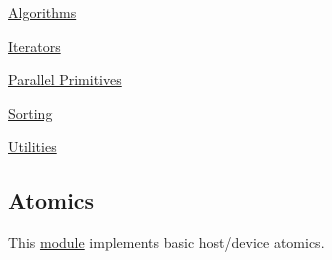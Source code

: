 \begin{DoxyItemize}
\item \hyperlink{algorithms_page}{Algorithms}
\item \hyperlink{iterators_page}{Iterators}
\item \hyperlink{primitives_page}{Parallel Primitives}
\item \hyperlink{sorting_page}{Sorting}
\item \hyperlink{utilities_page}{Utilities} 
\end{DoxyItemize}\hypertarget{atomics_page}{}\subsection{Atomics}\label{atomics_page}
\begin{DoxyParagraph}{}
This \hyperlink{group___atomics}{module} implements basic host/device atomics.
\end{DoxyParagraph}

